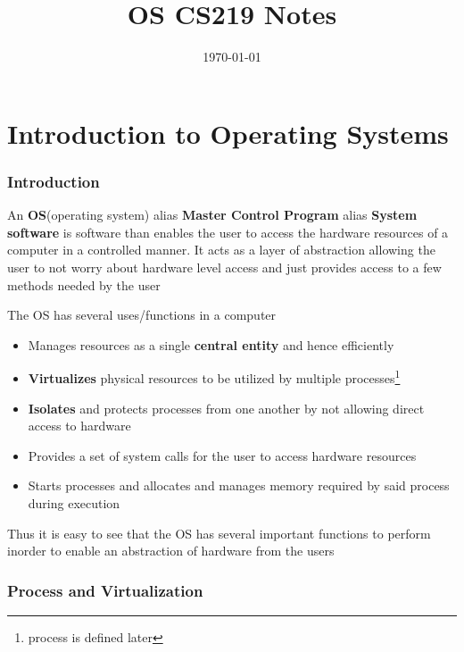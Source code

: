 \documentclass[12pt]{article}
\title{OS CS219 Notes}
\author{}
\date{\today}
\newcommand{\tbox}[1]{\noindent\fbox{\parbox{\textwidth}{#1}}}
\begin{document}
\maketitle
\setlength{\parskip}{6pt}
\setlength{\parindent}{0pt}

\noindent\tbox{
    \begin{center}
    \textbf{\Huge Lecture 1}
    \end{center}
}
\part{Introduction to Operating Systems}
\section{Introduction}
\noindent An \textbf{OS}(operating system) alias \textbf{Master Control Program} alias \textbf{System software} is software than enables the user to access the hardware resources of a computer 
in a controlled manner. It acts as a layer of abstraction allowing the user to not worry
about hardware level access and just provides access to a few methods needed by the user


\noindent The OS has several uses/functions in a computer
\begin{itemize}[topsep=0pt, partopsep=0pt, itemsep=0pt, parsep=0pt]
    \item Manages resources as a single \textbf{central entity} and hence efficiently
    \item \textbf{Virtualizes} physical resources to be utilized by multiple processes\footnote{process is defined later}
    \item \textbf{Isolates} and protects processes from one another by not allowing direct access to hardware 
    \item Provides a set of system calls for the user to access hardware resources
    \item Starts processes and allocates and manages memory required by said process during execution
\end{itemize}

\noindent Thus it is easy to see that the OS has several important functions to perform inorder to enable an abstraction of hardware from the users

\section{Process and Virtualization}
\end{document}
